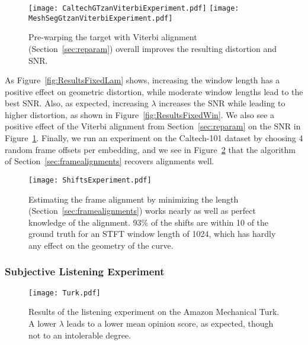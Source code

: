 \documentclass[runningheads]{llncs}
\begin{document}
\begin{figure}
  \centering
  \texttt{[image: CaltechGTzanViterbiExperiment.pdf]}
  \texttt{[image: MeshSegGtzanViterbiExperiment.pdf]}
  \caption{Pre-warping the target with Viterbi alignment (Section~\ref{sec:reparam}) overall improves the resulting distortion and SNR.}
  \label{fig:ResultsViterbiExperiment}
\end{figure}

As Figure~\ref{fig:ResultsFixedLam} shows, increasing the window length has a positive effect on geometric distortion, while moderate window lengths lead to the best SNR.  Also, as expected, increasing $\lambda$ increases the SNR while leading to higher distortion, as shown in Figure~\ref{fig:ResultsFixedWin}.  We also see a positive effect of the Viterbi alignment from Section~\ref{sec:reparam} on the SNR in Figure~\ref{fig:ResultsViterbiExperiment}.  Finally, we run an experiment on the Caltech-101 dataset by choosing 4 random frame offsets per embedding, and we see in Figure~\ref{fig:ShiftsExperiment} that the algorithm of Section~\ref{sec:framealignments} recovers alignments well.

\begin{figure}
  \centering
  \texttt{[image: ShiftsExperiment.pdf]}
  \caption{Estimating the frame alignment by minimizing the length (Section~\ref{sec:framealignments}) works nearly as well as perfect knowledge of the alignment. 93\% of the shifts are within 10 of the ground truth for an STFT window length of 1024, which has hardly any effect on the geometry of the curve.}
  \label{fig:ShiftsExperiment}
\end{figure}


\subsubsection{Subjective Listening Experiment}

\begin{figure}
  \begin{minipage}[c]{0.36\textwidth}
    \caption{
      Results of the listening experiment on the Amazon Mechanical Turk.  A lower $\lambda$ leads to a lower mean opinion score, as expected, though not to an intolerable degree.
    } \label{fig:TurkResults}
  \end{minipage}
  \begin{minipage}[c]{0.64\textwidth}
    \texttt{[image: Turk.pdf]}
  \end{minipage}\hfill
  
\end{figure}
\end{document}
